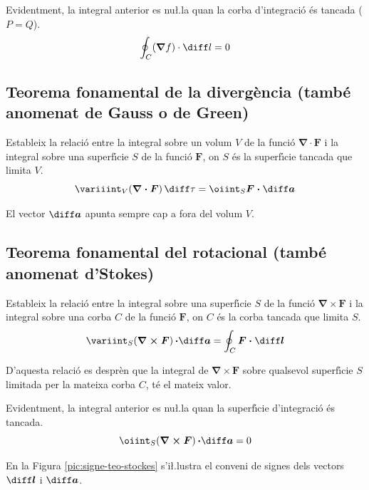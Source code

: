 \documentclass[catalan,a4paper,twoside,11pt]{article}
\begin{document}
Evidentment, la integral anterior es nu{\l.l}a quan la corba d'integraci\'{o} \'{e}s tancada ($P=Q$).
\begin{equation}
    \oint_C (\boldsymbol{\nabla}f) \cdot \diff l = 0
\end{equation}

\subsection{Teorema fonamental de la diverg\`{e}ncia (tamb\'{e} anomenat de Gauss o de Green)}
Estableix la relaci\'{o} entre la integral sobre un volum $V$ de la funci\'{o} $\boldsymbol{\nabla\cdot F}$ i la integral sobre una superf\'{\i}cie $S$ de la funci\'{o} $\boldsymbol{F}$, on $S$ \'{e}s la superf\'{\i}cie tancada que limita $V$.
\begin{equation}
    \variiint_V(\boldsymbol{\nabla\cdot F})\,\diff \tau = \oiint_S\boldsymbol{F\cdot\diff a}
\end{equation}

El vector $\boldsymbol{\diff a}$ apunta sempre cap a fora del volum $V$.

\subsection{Teorema fonamental del rotacional (tamb\'{e} anomenat d'Stokes)}
Estableix la relaci\'{o} entre la integral sobre una superf\'{\i}cie $S$ de la funci\'{o} $\boldsymbol{\nabla\times F}$ i la integral sobre una corba $C$ de la funci\'{o} $\boldsymbol{F}$, on $C$ \'{e}s la corba tancada que limita $S$.
\begin{equation}
    \variint_S(\boldsymbol{\nabla\times F})\boldsymbol{\,\cdot\diff a} =
    \oint_C\boldsymbol{F\cdot\diff l}
\end{equation}

D'aquesta relaci\'{o} es despr\`{e}n que la integral de $\boldsymbol{\nabla\times F}$ sobre qualsevol superf\'{\i}cie $S$ limitada per la mateixa corba $C$, t\'{e} el mateix valor.

Evidentment, la integral anterior es nu{\l.l}a quan la superf\'{\i}cie d'integraci\'{o} \'{e}s tancada.
\begin{equation}
    \oiint_S(\boldsymbol{\nabla\times F})\boldsymbol{\,\cdot\diff a} = 0
\end{equation}

En la Figura \vref{pic:signe-teo-stockes} s'i{\l.l}ustra el conveni de
signes dels vectors $\boldsymbol{\diff l}$ i $\boldsymbol{\diff a}$.
\end{document}
